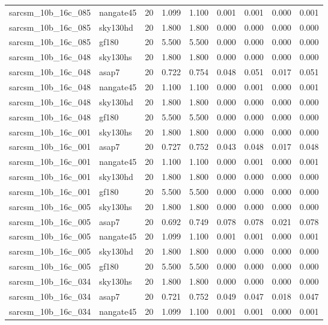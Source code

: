 \begin{tabular}{llrrrrrrr}
sarcsm\_10b\_16c\_085 & nangate45 & 20 & 1.099 & 1.100 & 0.001 & 0.001 & 0.000 & 0.001 \\
sarcsm\_10b\_16c\_085 & sky130hd & 20 & 1.800 & 1.800 & 0.000 & 0.000 & 0.000 & 0.000 \\
sarcsm\_10b\_16c\_085 & gf180 & 20 & 5.500 & 5.500 & 0.000 & 0.000 & 0.000 & 0.000 \\
sarcsm\_10b\_16c\_048 & sky130hs & 20 & 1.800 & 1.800 & 0.000 & 0.000 & 0.000 & 0.000 \\
sarcsm\_10b\_16c\_048 & asap7 & 20 & 0.722 & 0.754 & 0.048 & 0.051 & 0.017 & 0.051 \\
sarcsm\_10b\_16c\_048 & nangate45 & 20 & 1.100 & 1.100 & 0.000 & 0.001 & 0.000 & 0.001 \\
sarcsm\_10b\_16c\_048 & sky130hd & 20 & 1.800 & 1.800 & 0.000 & 0.000 & 0.000 & 0.000 \\
sarcsm\_10b\_16c\_048 & gf180 & 20 & 5.500 & 5.500 & 0.000 & 0.000 & 0.000 & 0.000 \\
sarcsm\_10b\_16c\_001 & sky130hs & 20 & 1.800 & 1.800 & 0.000 & 0.000 & 0.000 & 0.000 \\
sarcsm\_10b\_16c\_001 & asap7 & 20 & 0.727 & 0.752 & 0.043 & 0.048 & 0.017 & 0.048 \\
sarcsm\_10b\_16c\_001 & nangate45 & 20 & 1.100 & 1.100 & 0.000 & 0.001 & 0.000 & 0.001 \\
sarcsm\_10b\_16c\_001 & sky130hd & 20 & 1.800 & 1.800 & 0.000 & 0.000 & 0.000 & 0.000 \\
sarcsm\_10b\_16c\_001 & gf180 & 20 & 5.500 & 5.500 & 0.000 & 0.000 & 0.000 & 0.000 \\
sarcsm\_10b\_16c\_005 & sky130hs & 20 & 1.800 & 1.800 & 0.000 & 0.000 & 0.000 & 0.000 \\
sarcsm\_10b\_16c\_005 & asap7 & 20 & 0.692 & 0.749 & 0.078 & 0.078 & 0.021 & 0.078 \\
sarcsm\_10b\_16c\_005 & nangate45 & 20 & 1.099 & 1.100 & 0.001 & 0.001 & 0.000 & 0.001 \\
sarcsm\_10b\_16c\_005 & sky130hd & 20 & 1.800 & 1.800 & 0.000 & 0.000 & 0.000 & 0.000 \\
sarcsm\_10b\_16c\_005 & gf180 & 20 & 5.500 & 5.500 & 0.000 & 0.000 & 0.000 & 0.000 \\
sarcsm\_10b\_16c\_034 & sky130hs & 20 & 1.800 & 1.800 & 0.000 & 0.000 & 0.000 & 0.000 \\
sarcsm\_10b\_16c\_034 & asap7 & 20 & 0.721 & 0.752 & 0.049 & 0.047 & 0.018 & 0.047 \\
sarcsm\_10b\_16c\_034 & nangate45 & 20 & 1.099 & 1.100 & 0.001 & 0.001 & 0.000 & 0.001 \\

\end{tabular}
